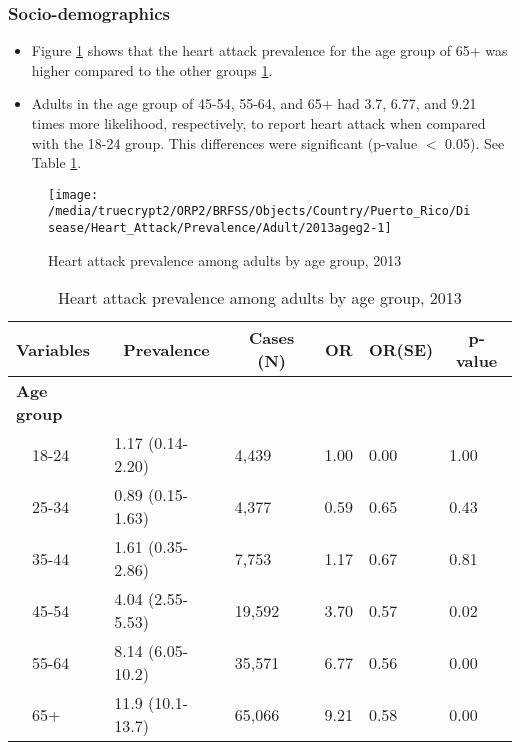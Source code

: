 \newpage
\subsubsection{Socio-demographics}

\begin{itemize}

\item Figure \ref{fig:age.Heart_Attack.2013} shows that the heart attack prevalence for the age group of 65+ was higher compared to the other groups \ref{tab:age.Heart_Attack.2013}.

\item Adults in the age group of 45-54, 55-64, and 65+ had 3.7, 6.77, and 9.21 times more likelihood, respectively, to report heart attack when compared with the 18-24 group. This differences were significant (p-value $<$ 0.05). See Table \ref{tab:age.Heart_Attack.2013}.


\end{itemize}


\begin{figure}[H]
\caption{Heart attack prevalence among adults by age group, 
2013}
\begin{knitrout}
\color{fgcolor}

{\centering \texttt{[image: /media/truecrypt2/ORP2/BRFSS/Objects/Country/Puerto\_Rico/Disease/Heart\_Attack/Prevalence/Adult/2013ageg2-1]} 

}



\end{knitrout}
\label{fig:age.Heart_Attack.2013}
\end{figure}

\begin{table}[H]
\caption{Heart attack prevalence among adults by age group, 2013\label{tab:age.Heart_Attack.2013}} 
\begin{center}
\begin{tabular}{llllll}
\hline\hline
\multicolumn{1}{l}{Variables}&\multicolumn{1}{c}{Prevalence}&\multicolumn{1}{c}{Cases (N)}&\multicolumn{1}{c}{OR}&\multicolumn{1}{c}{OR(SE)}&\multicolumn{1}{c}{p-value}\tabularnewline
\hline
{\bfseries Age group}&&&&&\tabularnewline
~~18-24&1.17 (0.14-2.20)& 4,439&1.00&0.00&1.00\tabularnewline
~~25-34&0.89 (0.15-1.63)& 4,377&0.59&0.65&0.43\tabularnewline
~~35-44&1.61 (0.35-2.86)& 7,753&1.17&0.67&0.81\tabularnewline
~~45-54&4.04 (2.55-5.53)&19,592&3.70&0.57&0.02\tabularnewline
~~55-64&8.14 (6.05-10.2)&35,571&6.77&0.56&0.00\tabularnewline
~~65+&11.9 (10.1-13.7)&65,066&9.21&0.58&0.00\tabularnewline
\hline
\end{tabular}\end{center}

\end{table}


